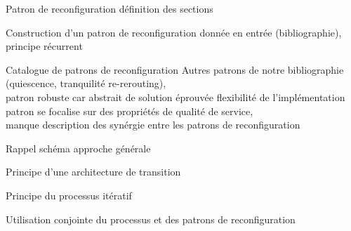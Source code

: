 \begin{frame}{Patron de reconfiguration}
    définition des sections
\end{frame}

\begin{frame}{Construction d'un patron de reconfiguration}
    donnée en entrée (bibliographie), 
principe récurrent
\end{frame}

\begin{frame}{Catalogue de patrons de reconfiguration}
    Autres patrons de notre bibliographie (quiescence, tranquilité re-rerouting),\\
patron robuste car abstrait de solution éprouvée
flexibilité de l'implémentation\\
patron se focalise sur des propriétés de qualité de service,\\ 
manque  description des synérgie entre les patrons de reconfiguration
\end{frame}

\begin{frame}{Rappel schéma approche générale}
    
\end{frame}

\begin{frame}{Principe d'une architecture de transition}
\end{frame}

\begin{frame}{Principe du processus itératif}
\end{frame}

\begin{frame}{Utilisation conjointe du processus et des patrons de reconfiguration}
\end{frame}